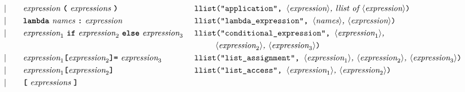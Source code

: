 \begin{alignat*}{9}
  &&                       && |   &\quad && \textit{expression} \ \textbf{\texttt{(}}\ \textit{expressions}\ \textbf{\texttt{)}}
                                                            && \texttt{llist("application",  } \langle \textit{expression}\rangle \textit{, llist of  } \langle \textit{expression}\rangle \texttt{)}                                                 \\
  &&                       && |   &\quad && \textbf{\texttt{lambda}}\ \textit{names}\ \texttt{\textbf{:}}\ \textit{expression}
                                                            && \texttt{llist("lambda\_expression",  } \langle \textit{names}\rangle \textit{,  } \langle \textit{expression}\rangle \texttt{)}                                                                     \\
  &&                       && |   &\quad && \textit{expression}_1 \ \textbf{\texttt{if}}\ \textit{expression}_2 \ \textbf{\texttt{else}}\ \textit{expression}_3\
                                                            && \texttt{llist("conditional\_expression",  } \langle \textit{expression}_1\rangle \textit{,}                                                                                                   \\
                                                            &&&&&&&&&\ \ \ \ \ \ \texttt{ } \langle \textit{expression}_2\rangle \textit{,  } \langle \textit{expression}_3\rangle \texttt{)}                                                                       \\
  &&                       && |   &\quad && \textit{expression}_1 \textbf{\texttt{[}}
                                            \textit{expression}_2 \textbf{\texttt{]=}}\ \textit{expression}_3
                                                            && \texttt{llist("list\_assignment",  } \langle \textit{expression}_1\rangle \textit{,  } \langle \textit{expression}_2\rangle \textit{,  } \langle \textit{expression}_3\rangle \texttt{)}      \\
  &&                       && |   &\quad && \textit{expression}_1 \textbf{\texttt{[}} \textit{expression}_2 \textbf{\texttt{]}}
                                                            && \texttt{llist("list\_access",  } \langle \textit{expression}_1\rangle \textit{,  } \langle \textit{expression}_2\rangle \texttt{)}                                                            \\
  &&                       && |   &\quad && \textbf{\texttt{[}}\ \textit{expressions}\ \textbf{\texttt{]}}

\end{alignat*}
